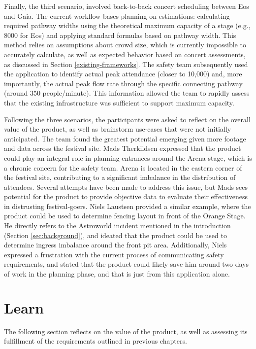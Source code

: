 Finally, the third scenario, involved back-to-back concert scheduling between Eos and Gaia. The current workflow bases planning on estimations: calculating required pathway widths using the theoretical maximum capacity of a stage (e.g., 8000 for Eos) and applying standard formulas based on pathway width. This method relies on assumptions about crowd size, which is currently impossible to accurately calculate, as well as expected behavior based on concert assessments, as discussed in Section \ref{existing-frameworks}. The safety team subsequently used the application to identify actual peak attendance (closer to 10,000) and, more importantly, the actual peak flow rate through the specific connecting pathway (around 350 people/minute). This information allowed the team to rapidly assess that the existing infrastructure was sufficient to support maximum capacity.

Following the three scenarios, the participants were asked to reflect on the overall value of the product, as well as brainstorm use-cases that were not initially anticipated. The team found the greatest potential emerging given more footage and data across the festival site. Mads Therkildsen expressed that the product could play an integral role in planning entrances around the Arena stage, which is a chronic concern for the safety team. Arena is located in the eastern corner of the festival site, contributing to a significant imbalance in the distribution of attendees. Several attempts have been made to address this issue, but Mads sees potential for the product to provide objective data to evaluate their effectiveness in distrusting festival-goers. Niels Laustsen provided a similar example, where the product could be used to determine fencing layout in front of the Orange Stage. He directly refers to the Astroworld incident mentioned in the introduction (Section \ref{sec:background}), and ideated that the product could be used to determine ingress imbalance around the front pit area. Additionally, Niels expressed a frustration with the current process of communicating safety requirements, and stated that the product could likely save him around two days of work in the planning phase, and that is just from this application alone.

\section{Learn}

The following section reflects on the value of the product, as well as assessing its fulfillment of the requirements outlined in previous chapters.

